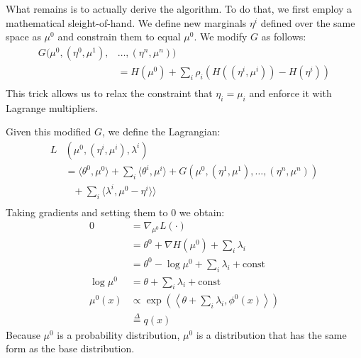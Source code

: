 \documentclass[times, 10pt,twocolumn]{article}
\begin{document}
What remains is to actually derive the algorithm. To do that, we
first employ a mathematical sleight-of-hand. We define new
marginals $\eta^i$ defined over the same space as $\mu^0$ and
constrain them to equal $\mu^0$. We modify $G$ as follows:
\begin{equation*}
  \begin{split}
     G (\mu^0,(\eta^0,\mu^1),&\ldots,(\eta^n,\mu^n) )\\
     &= H(\mu^0) + \sum_i \rho_i \left( H( (\eta^i, \mu^i)) -
     H(\eta^i) \right )  \\ 
   \end{split}
 \end{equation*}
This trick allows us to relax the constraint that $\eta_i = \mu_i$
and enforce it with Lagrange multipliers.

Given this modified $G$, we define the Lagrangian:
\begin{equation}
  \begin{split}
     L&(\mu^0,(\eta^i,\mu^i), \lambda^i) \\
     &= \langle\theta^0,\mu^0\rangle + \sum_i \langle
     \theta^i,\mu^i\rangle  +G(\mu^0, (\eta^1, \mu^1), \ldots,
     (\eta^n,\mu^n)) \\
     &\phantom{\cdots}+ \sum_i \langle \lambda^i, \mu^0 -
     \eta^i\rangle
     \rangle \\
   \end{split}
 \end{equation}
Taking gradients and setting them to 0 we obtain:
\begin{equation}
  \begin{split}
    0 &= \nabla_{\mu^0} L(\cdot) \\
    &= \theta^0 + \nabla H(\mu^0) + \sum_i
    \lambda_i \\
    &= \theta^0  - \log \mu^0 + \sum_i \lambda_i + \mathrm{const} \\
    \log \mu^0 &= \theta  + \sum_i \lambda_i + \mathrm{const} \\ 
    \mu^0(x) &\propto \exp(\left \langle \theta  + \sum_i \lambda_i, \phi^0(x) \right\rangle)\\
    &\stackrel{\Delta}{=} q(x)
   \end{split}
 \end{equation}
Because $\mu^0$  is a probability distribution, $\mu^0$ is a
distribution that has the same form as the base distribution.
\end{document}
